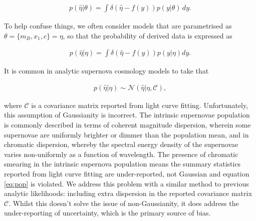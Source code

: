 \documentclass[a4paper,fleqn,usenatbib]{mnras}
\begin{document}
\begin{align}
p(\hat{\eta} | \theta) = \int \delta(\hat{\eta} - f(y)) p(y | \theta) \, dy.
\end{align}

To help confuse things, we often consider models that are parametrised as $\theta = \lbrace m_B, x_1, c \rbrace = \eta$, so that the probability of derived data is expressed as

\begin{align}
p(\hat{\eta}|\eta) = \int \delta(\hat{\eta} - f(y)) p(y|\eta) dy. \label{eq:intsmear}
\end{align}

It is common in analytic supernova cosmology models to take that

\begin{align}
p(\hat{\eta}|\eta) \sim \mathcal{N}(\hat{\eta} | \eta, \mathcal{C}), \label{eq:pop}
\end{align}

where $\mathcal{C}$ is a covariance matrix reported from light curve fitting. Unfortunately, this assumption of Gaussianity is incorrect. The intrinsic supernovae population is commonly described in terms of coherent magnitude dispersion, wherein some supernovae are uniformly brighter or dimmer than the population mean, and in chromatic dispersion, whereby the spectral energy density of the supernovae varies non-uniformly as a function of wavelength. The presence of chromatic smearing in the intrinsic supernova population \citep{Guy2010, Chotard2011} means the summary statistics reported from light curve fitting are under-reported, not Gaussian and equation \eqref{eq:pop} is violated. We address this problem with a similar method to previous analytic likelihoods: including extra dispersion in the reported covariance matrix $\mathcal{C}$. Whilst this doesn't solve the issue of non-Gaussianity, it does address the under-reporting of uncertainty, which is the primary source of bias.
\end{document}
